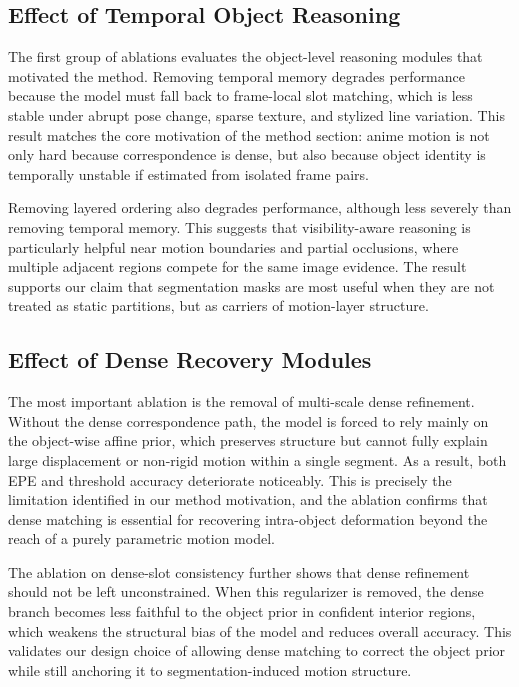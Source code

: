 \subsection{Effect of Temporal Object Reasoning}

The first group of ablations evaluates the object-level reasoning modules that motivated the method. Removing temporal memory degrades performance because the model must fall back to frame-local slot matching, which is less stable under abrupt pose change, sparse texture, and stylized line variation. This result matches the core motivation of the method section: anime motion is not only hard because correspondence is dense, but also because object identity is temporally unstable if estimated from isolated frame pairs.

Removing layered ordering also degrades performance, although less severely than removing temporal memory. This suggests that visibility-aware reasoning is particularly helpful near motion boundaries and partial occlusions, where multiple adjacent regions compete for the same image evidence. The result supports our claim that segmentation masks are most useful when they are not treated as static partitions, but as carriers of motion-layer structure.

\subsection{Effect of Dense Recovery Modules}

The most important ablation is the removal of multi-scale dense refinement. Without the dense correspondence path, the model is forced to rely mainly on the object-wise affine prior, which preserves structure but cannot fully explain large displacement or non-rigid motion within a single segment. As a result, both EPE and threshold accuracy deteriorate noticeably. This is precisely the limitation identified in our method motivation, and the ablation confirms that dense matching is essential for recovering intra-object deformation beyond the reach of a purely parametric motion model.

The ablation on dense-slot consistency further shows that dense refinement should not be left unconstrained. When this regularizer is removed, the dense branch becomes less faithful to the object prior in confident interior regions, which weakens the structural bias of the model and reduces overall accuracy. This validates our design choice of allowing dense matching to correct the object prior while still anchoring it to segmentation-induced motion structure.

